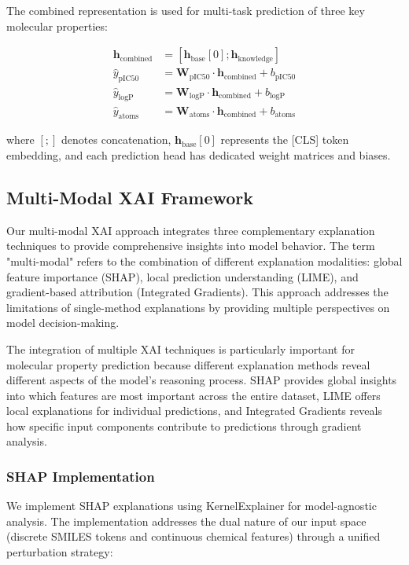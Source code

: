 \documentclass[preprint,12pt]{elsarticle}
\begin{document}
The combined representation is used for multi-task prediction of three key molecular properties:

\begin{align}
\mathbf{h}_{\text{combined}} &= [\mathbf{h}_{\text{base}}[0]; \mathbf{h}_{\text{knowledge}}] \\
\hat{y}_{\text{pIC50}} &= \mathbf{W}_{\text{pIC50}} \cdot \mathbf{h}_{\text{combined}} + b_{\text{pIC50}} \\
\hat{y}_{\text{logP}} &= \mathbf{W}_{\text{logP}} \cdot \mathbf{h}_{\text{combined}} + b_{\text{logP}} \\
\hat{y}_{\text{atoms}} &= \mathbf{W}_{\text{atoms}} \cdot \mathbf{h}_{\text{combined}} + b_{\text{atoms}}
\end{align}

where $[;]$ denotes concatenation, $\mathbf{h}_{\text{base}}[0]$ represents the [CLS] token embedding, and each prediction head has dedicated weight matrices and biases.



\subsection{Multi-Modal XAI Framework}

Our multi-modal XAI approach integrates three complementary explanation techniques to provide comprehensive insights into model behavior. The term "multi-modal" refers to the combination of different explanation modalities: global feature importance (SHAP), local prediction understanding (LIME), and gradient-based attribution (Integrated Gradients). This approach addresses the limitations of single-method explanations by providing multiple perspectives on model decision-making.

The integration of multiple XAI techniques is particularly important for molecular property prediction because different explanation methods reveal different aspects of the model's reasoning process. SHAP provides global insights into which features are most important across the entire dataset, LIME offers local explanations for individual predictions, and Integrated Gradients reveals how specific input components contribute to predictions through gradient analysis.

\subsubsection*{SHAP Implementation}

We implement SHAP explanations using KernelExplainer for model-agnostic analysis. The implementation addresses the dual nature of our input space (discrete SMILES tokens and continuous chemical features) through a unified perturbation strategy:
\end{document}
